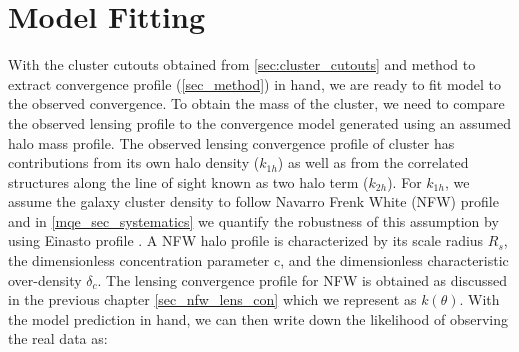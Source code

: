 \section{Model Fitting}
 \label{sec_model_fitting}
 With the cluster cutouts obtained from \ref{sec:cluster_cutouts} and method to extract convergence profile (\ref{sec_method}) in hand, we are ready to fit model to the observed convergence.
To obtain the mass of the cluster, we need to compare the observed lensing profile to the convergence model generated using an assumed halo mass profile.
 The observed lensing convergence profile of cluster has contributions from its own halo density ($k_{1h}$) as well as from the correlated structures along the line of sight known as two halo term ($k_{2h}$).
 For $k_{1h}$, we assume the galaxy cluster density to follow Navarro Frenk White (NFW) profile and in \ref{mqe_sec_systematics} we quantify the robustness of this assumption by using Einasto profile \citep{einasto89}.
 A NFW halo profile is characterized by its scale radius $R_{s}$, the dimensionless concentration parameter c, and the dimensionless characteristic over-density $\delta_{c}$.
 The lensing convergence profile for NFW is obtained as discussed in the previous chapter \ref{sec_nfw_lens_con} which we represent as $k(\theta)$.
%
With the model prediction in hand, we can then write down the likelihood of observing the real data as: 
